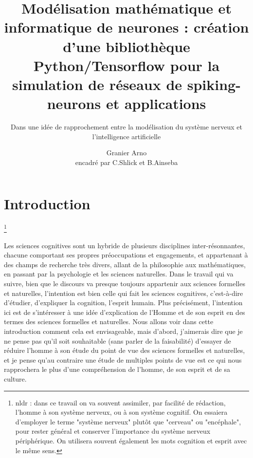 \documentclass[12pt]{scrartcl}
\title{Modélisation mathématique et informatique de neurones : création d'une bibliothèque Python/Tensorflow pour la simulation de réseaux de spiking-neurons et applications }
\subtitle{Dans une idée de rapprochement entre la modélisation du système nerveux et l'intelligence artificielle}
\author{Granier Arno \\ encadré par C.Shlick et B.Ainseba}
\newcommand\blfootnote[1]{%
  \begingroup
  \renewcommand\thefootnote{}\footnote{#1}%
  \addtocounter{footnote}{-1}%
  \endgroup
}
\begin{document}
\maketitle

\tableofcontents

\pagebreak


\part{Introduction}
\blfootnote{nldr : dans ce travail on va souvent assimiler, par facilité de rédaction, l'homme à son système nerveux, ou à son système cognitif. On essaiera d'employer le terme "système nerveux" plutôt que "cerveau" ou "encéphale", pour rester général et conserver l'importance du système nerveux périphérique. On utilisera souvent également les mots cognition et esprit avec le même sens.}

Les sciences cognitives sont un hybride de plusieurs disciplines inter-résonnantes, chacune comportant ses propres préoccupations et engagements, et appartenant à des champs de recherche très divers, allant de la philosophie aux mathématiques, en passant par la psychologie et les sciences naturelles. Dans le travail qui va suivre, bien que le discours va presque toujours appartenir aux sciences formelles et naturelles, l'intention est bien celle qui fait les sciences cognitives, c'est-à-dire d'étudier, d'expliquer la cognition, l'esprit humain. Plus précisément, l'intention ici est de s'intéresser à une idée d'explication de l'Homme et de son esprit en des termes des sciences formelles et naturelles. Nous allons voir dans cette introduction comment cela est envisageable, mais d'abord, j'aimerais dire que je ne pense pas qu'il soit souhaitable (sans parler de la faisabilité) d'essayer de réduire l'homme à son étude du point de vue des sciences formelles et naturelles, et je pense qu'au contraire une étude de multiples points de vue est ce qui nous rapprochera le plus d'une compréhension de l'homme, de son esprit et de sa culture.\\
\end{document}
